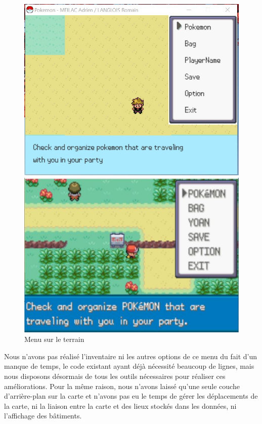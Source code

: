 \begin{figure}[!h]
\begin{minipage}{0.49\textwidth}
\includegraphics[scale = 0.6]{../Images/fieldMenu.jpg}
\end{minipage}
\begin{minipage}{0.49\textwidth}
\includegraphics[scale = 0.84]{../Images/vrai_jeu_fieldMenu.jpg}
\end{minipage}
\caption{Menu sur le terrain}
\end{figure}

Nous n'avons pas réalisé l'inventaire ni les autres options de ce menu du fait d'un manque de temps, le code existant ayant déjà nécessité beaucoup de lignes, mais nous disposons désormais de tous les outils nécessaires pour réaliser ces améliorations. Pour la même raison, nous n'avons laissé qu'une seule couche d'arrière-plan sur la carte et n'avons pas eu le temps de gérer les déplacements de la carte, ni la liaison entre la carte et des lieux stockés dans les données, ni l'affichage des bâtiments.
